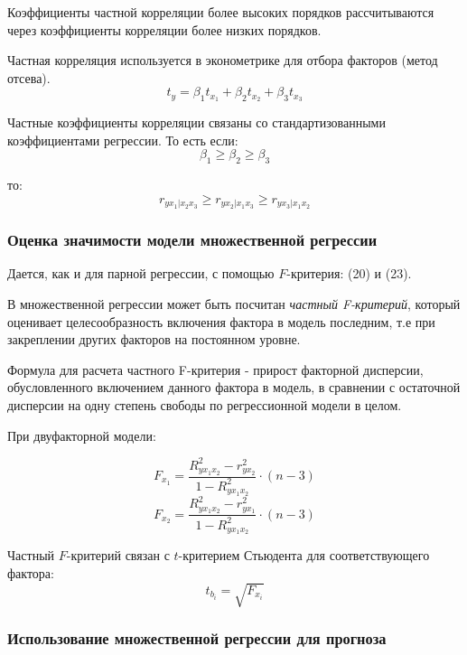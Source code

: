 \documentclass[aps,%
12pt,%
final,%
oneside,
onecolumn,%
musixtex, %
superscriptaddress,%
centertags]{article} %
\begin{document}
Коэффициенты частной корреляции более высоких порядков рассчитываются через коэффициенты корреляции более низких порядков.

Частная корреляция используется в эконометрике для отбора факторов (метод отсева).
$$ t_y = \beta_1 t_{x_1} + \beta_2 t_{x_2} + \beta_3 t_{x_3}$$


Частные коэффициенты корреляции связаны со стандартизованными коэффициентами регрессии. То есть если:
$$ \beta_1 \geq \beta_2 \geq \beta_3 $$

то:
$$
r_{yx_1|x_2x_3} \geq r_{yx_2|x_1x_3} \geq  r_{yx_3|x_1x_2} 
$$

\subsubsection{Оценка значимости модели множественной регрессии}
Дается, как и для парной регрессии, с помощью $F$-критерия: (20) и (23).

В множественной регрессии может быть посчитан \textit{частный F-критерий}, который оценивает целесообразность включения фактора в модель последним, т.е при закреплении других факторов на постоянном уровне.

Формула для расчета частного F-критерия - прирост факторной дисперсии, обусловленного включением данного фактора в модель, в сравнении с остаточной дисперсии на одну степень свободы по регрессионной модели в целом.

При двуфакторной модели:

$$F_{x_1} = \frac{R_{yx_1x_2}^2 - r_{yx_2}^2}{1-R_{yx_1x_2}^2} \cdot (n-3)$$
$$F_{x_2} = \frac{R_{yx_1x_2}^2 - r_{yx_1}^2}{1-R_{yx_1x_2}^2} \cdot (n-3)$$

Частный $F$-критерий связан с $t$-критерием Стьюдента для соответствующего фактора:
$$ t_{b_i} = \sqrt{F_{x_i}}$$

\subsubsection{Использование множественной регрессии для прогноза}
\end{document}
